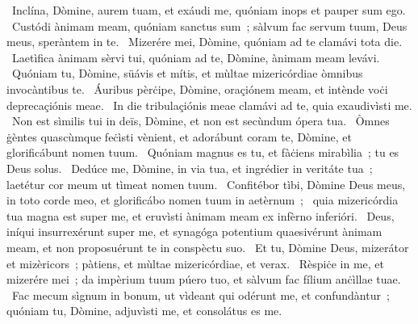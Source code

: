 \psalmChapterWithInscription{}
{ }
{%
~Inclína, Dòmine, aurem tuam, et exáudi me, quóniam inops et pauper sum ego. 
~Custódi ànimam meam, quóniam sanctus sum~; sàlvum fac servum tuum, Deus meus, speràntem in te. 
~Mizerére mei, Dòmine, quóniam ad te clamávi tota die. 
~Laetìfica ànimam sèrvi tui, quóniam ad te, Dòmine, ànimam meam levávi. 
~Quóniam tu, Dòmine, süávis et mítis, et mùltae mizericórdiae òmnibus invocàntibus te. 
~Áuribus pèrċipe, Dòmine, oraçiónem meam, et intènde voċi deprecaçiónis meae. 
~In die tribulaçiónis meae clamávi ad te, quia exaudivìsti me. 
~Non est sìmilis tui in deïs, Dòmine, et non est secùndum ópera tua. 
~Òmnes ġèntes quascùmque feċìsti vènient, et adorábunt coram te, Dòmine, et glorificábunt nomen tuum. 
~Quóniam magnus es tu, et fàċiens mirabìlia~; tu es Deus solus. 
~Dedúce me, Dòmine, in via tua, et ingrédier in veritáte tua~; laetétur cor meum ut tìmeat nomen tuum. 
~Confitébor tìbi, Dòmine Deus meus, in toto corde meo, et glorificábo nomen tuum in aetèrnum~; 
~quia mizericórdia tua magna est super me, et eruvìsti ànimam meam ex infèrno inferióri. 
~Deus, iníqui insurrexérunt super me, et synagóga potentium quaesivérunt ànimam meam, et non proposuérunt te in conspèctu suo. 
~Et tu, Dòmine Deus, mizerátor et mizèricors~; pàtiens, et mùltae mizericórdiae, et verax. 
~Rèspiċe in me, et mizerére mei~; da impèrium tuum púero tuo, et sàlvum fac fílium anċìllae tuae. 
~Fac mecum sìgnum in bonum, ut vìdeant qui odérunt me, et confundàntur~; quóniam tu, Dòmine, adjuvìsti me, et consolátus es me. 
}
